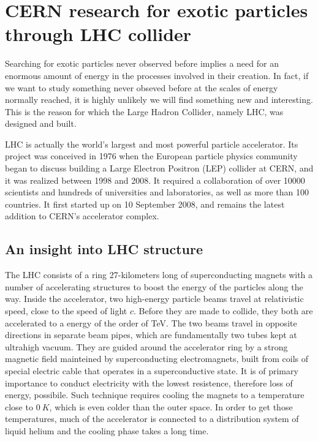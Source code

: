 \chapter{CERN research for exotic particles through LHC collider}
\label{chap:LHC}





Searching for exotic particles never observed before implies a need for an enormous amount of energy in the processes involved in their creation. In fact, if we want to study something never obseved before at the scales of energy normally reached, it is highly unlikely we will find something new and interesting. This is the reason for which the Large Hadron Collider, namely LHC, was designed and built.

LHC is actually the world's largest and most powerful particle accelerator. Its project was conceived in 1976 when the European particle physics community began to discuss building a Large Electron Positron (LEP) collider at CERN, and it was realized between 1998 and 2008. It required a collaboration of over 10000 scientists and hundreds of universities and laboratories, as well as more than 100 countries. It first started up on 10 September 2008, and remains the latest addition to CERN’s accelerator complex.






\section{An insight into LHC structure}
The LHC consists of a ring 27-kilometers long of superconducting magnets with a number of accelerating structures to boost the energy of the particles along the way. Inside the accelerator, two high-energy particle beams travel at relativistic speed, close to the speed of light $c$. Before they are made to collide, they both are accelerated to a energy of the order of TeV. The two beams travel in opposite directions in separate beam pipes, which are fundamentally two tubes kept at ultrahigh vacuum. They are guided around the accelerator ring by a strong magnetic field mainteined by superconducting electromagnets, built from coils of special electric cable that operates in a superconductive state. It is of primary importance to conduct electricity with the lowest resistence, therefore loss of energy, possibile. Such technique requires cooling the magnets to a temperature close to $0~\si{K}$, which is even colder than the outer space. In order to get those temperatures, much of the accelerator is connected to a distribution system of liquid helium and the cooling phase takes a long time.

